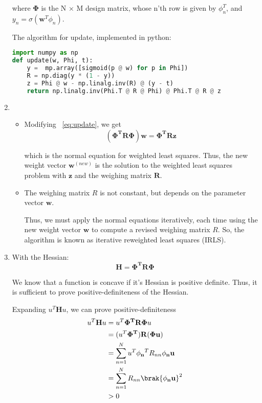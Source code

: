 \documentclass{amsart}
\begin{document}
\begin{enumerate}[label=\textbf{(\Roman*)}]
        where \(\mathbf{\Phi}\) is the N × M design matrix, whose n'th row is given by \(\phi_n^T\), and \(y_n = \sigma(\mathbf{w}^T \phi_n)\).

        The algorithm for update, implemented in python:

        \begin{lstlisting}[language=Python]
import numpy as np
def update(w, Phi, t):
    y =  mp.array([sigmoid(p @ w) for p in Phi])
    R = np.diag(y * (1 - y))
    z = Phi @ w - np.linalg.inv(R) @ (y - t)
    return np.linalg.inv(Phi.T @ R @ Phi) @ Phi.T @ R @ z
        \end{lstlisting}

        \item 
        \begin{itemize}
            \item Modifying ~\ref{eq:update}, we get 
            \[(\mathbf{\Phi^T R \Phi}) \mathbf{w} = \mathbf{\Phi^T R z}\]
    
            which is the normal equation for weighted least squares. Thus, the new weight vector \(\mathbf{w}^{(new)}\) is the solution to the weighted least squares problem with \(\mathbf{z}\) and the weighing matrix \(\mathbf{R}\).
            
            \item The weighing matrix \(R\) is not constant, but depends on the parameter vector \(\mathbf{w}\).
            
            Thus, we must apply the normal equations iteratively, each time using the new weight vector \(\mathbf{w}\) to compute a revised weighing matrix \(R\). So, the algorithm is known as iterative reweighted least squares (IRLS).
        \end{itemize}
        \item 
        With the Hessian: \[\mathbf{H} = \mathbf{\Phi^T R \Phi}\]

        We know that a function is concave if it's Hessian is positive definite. Thus, it is sufficient to prove positive-definiteness of the Hessian.

        Expanding \(u^T \mathbf{H} u\), we can prove positive-definiteness \begin{align}
            \begin{split}
                u^T \mathbf{H} u &= u^T \mathbf{\Phi^T R \Phi} u \\
                &= (u^T \mathbf{\Phi^T}) \mathbf{R} (\mathbf{\Phi u}) \\
                &= \sum_{n = 1}^{N} u^T \mathbf{\phi_n}^T R_{nn} \mathbf{\phi_n u} \\
                &= \sum_{n = 1}^{N} R_{nn} \brak{\mathbf{\phi_n u}}^2 \\
                &> 0
            \end{split}
        \end{align}


    \end{enumerate}
\end{document}
